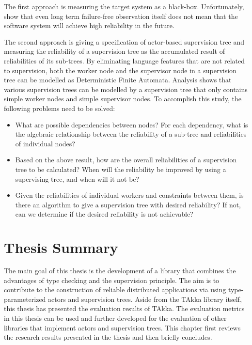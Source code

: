 The first approach is measuring the target system as a black-box.  
Unfortunately, \citet{Littlewood93} show that even long term failure-free 
observation itself does not mean that the software system will achieve high 
reliability in the future.  

The second approach is giving a specification of actor-based supervision tree 
and measuring the reliability of a supervision tree as the accumulated result 
of reliabilities of its sub-trees. 
By eliminating language features that are not related to supervision, both the worker 
node and the supervisor node in a supervision tree can be modelled as  
Deterministic Finite Automata.  Analysis shows that various
supervision trees can be modelled by a supervision tree that only contains 
simple worker nodes and simple supervisor nodes. 
To accomplish this study, the following problems need to be solved:
\begin{itemize}
  \item What are possible dependencies between nodes? For each dependency,
what is the algebraic relationship between the reliability of a sub-tree
and reliabilities of individual nodes?
  \item Based on the above result, how are the overall reliabilities
of a supervision tree to be calculated? When will the reliability be improved 
by using a supervising tree, and when will it not be?
  \item Given the reliabilities of individual workers and constraints between
them, is there an algorithm to give a supervision tree with desired 
reliability?  If not, can we determine if the desired reliability is not
achievable?
\end{itemize}


\chapter{Thesis Summary}
\label{summary}

The main goal of this thesis is the development of a library that combines the 
advantages of type checking and the supervision principle.  The aim is to 
contribute to the construction of reliable distributed applications via using 
type-parameterized actors and supervision trees.  Aside from the TAkka library 
itself, this thesis has presented the evaluation results of TAkka.  The 
evaluation metrics in this thesis can be used and further developed for the 
evaluation of other libraries that implement actors and supervision trees.  This 
chapter first reviews the research results presented in the thesis and then 
briefly concludes.


